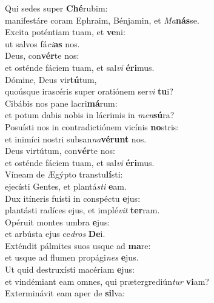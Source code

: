 \evenverse Qui sedes super \textbf{Ché}rubim:~\*\\
\evenverse manifestáre coram Ephraim, Bénjamin, et \textit{Ma}\textbf{nás}se.\\
\oddverse Excita poténtiam tuam, et \textbf{ve}ni:~\*\\
\oddverse ut salvos fá\textit{ci}\textbf{as} nos.\\
\evenverse Deus, con\textbf{vér}te nos:~\*\\
\evenverse et osténde fáciem tuam, et sal\textit{vi} \textbf{é}\textbf{ri}mus.\\
\oddverse Dómine, Deus vir\textbf{tú}tum,~\*\\
\oddverse quoúsque irascéris super oratiónem ser\textit{vi} \textbf{tu}i?\\
\evenverse Cibábis nos pane lacri\textbf{má}rum:~\*\\
\evenverse et potum dabis nobis in lácrimis in \textit{men}\textbf{sú}ra?\\
\oddverse Posuísti nos in contradictiónem vicínis \textbf{no}stris:~\*\\
\oddverse et inimíci nostri subsan\textit{na}\textbf{vé}\textbf{runt} nos.\\
\evenverse Deus virtútum, con\textbf{vér}te nos:~\*\\
\evenverse et osténde fáciem tuam, et sal\textit{vi} \textbf{é}\textbf{ri}mus.\\
\oddverse Víneam de Ægýpto transtu\textbf{lí}sti:~\*\\
\oddverse ejecísti Gentes, et plantá\textit{sti} \textbf{e}am.\\
\evenverse Dux itíneris fuísti in conspéctu \textbf{e}jus:~\*\\
\evenverse plantásti radíces ejus, et implé\textit{vit} \textbf{ter}ram.\\
\oddverse Opéruit montes umbra \textbf{e}jus:~\*\\
\oddverse et arbústa ejus ce\textit{dros} \textbf{De}i.\\
\evenverse Exténdit pálmites suos usque ad \textbf{ma}re:~\*\\
\evenverse et usque ad flumen propági\textit{nes} \textbf{e}jus.\\
\oddverse Ut quid destruxísti macériam \textbf{e}jus:~\*\\
\oddverse et vindémiant eam omnes, qui prætergrediún\textit{tur} \textbf{vi}am?\\
\evenverse Exterminávit eam aper de \textbf{sil}va:~\*\\
